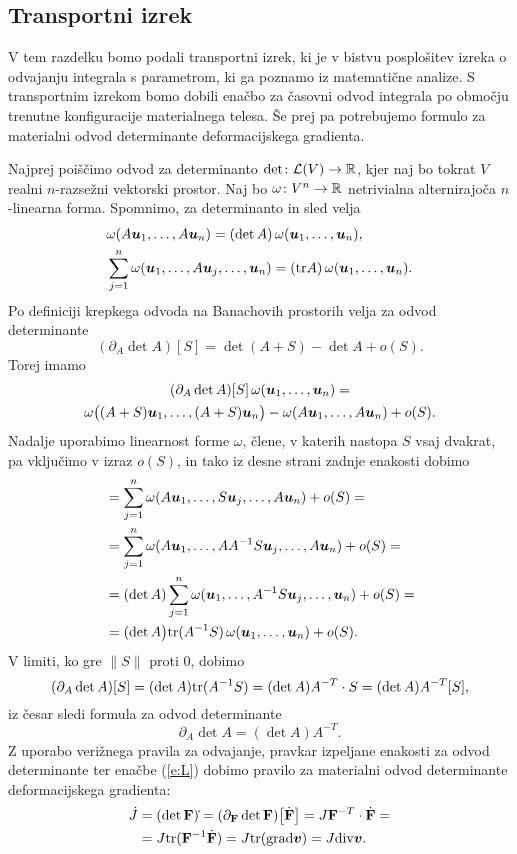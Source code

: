 \subsection{Transportni izrek}


V tem razdelku bomo podali transportni izrek, ki je v bistvu posplošitev izreka o odvajanju
integrala s parametrom, ki ga poznamo iz matematične analize. S transportnim izrekom
bomo dobili enačbo za časovni odvod integrala po območju trenutne konfiguracije materialnega telesa.
Še prej pa potrebujemo formulo za materialni odvod determinante deformacijskega gradienta.

Najprej poiščimo odvod za determinanto $\det\colon\mathcal L(V)\to\mathbb R$, kjer naj bo tokrat $V$
realni $n$-razsežni vektorski prostor. Naj bo $\omega\colon V^n\to\mathbb R$ netrivialna
alternirajoča $n$-linearna forma. Spomnimo, za determinanto in sled velja
\begin{align*}
	&\omega(A\boldsymbol u_1,\dots,A\boldsymbol u_n)=(\det A)\,\omega(\boldsymbol u_1,\dots,\boldsymbol u_n), \\
	&\sum_{j=1}^n\omega(\boldsymbol u_1,\dots,A\boldsymbol u_j,\dots,\boldsymbol u_n)=(\mathrm{tr} A)\,\omega(\boldsymbol u_1,\dots,\boldsymbol u_n).
\end{align*}
Po definiciji krepkega odvoda na Banachovih prostorih velja za odvod determinante
\[ (\partial_{A}\det A)[S] = \det(A+S) - \det A + o(S). \]
Torej imamo
\begin{multline*}
	(\partial_{A}\det A)[S]\,\omega(\boldsymbol u_1,\dots,\boldsymbol u_n)=\\
	\omega\big((A+S)\boldsymbol u_1,\dots,(A+S)\boldsymbol u_n\big) -
	\omega(A\boldsymbol u_1,\dots,A\boldsymbol u_n) + o(S).
\end{multline*}
Nadalje uporabimo linearnost forme $\omega$, člene, v katerih nastopa $S$ vsaj dvakrat,
pa vključimo v izraz $o(S)$, in tako iz desne strani zadnje enakosti dobimo
\begin{align*}
	&= \sum_{j=1}^n\omega(A\boldsymbol u_1,\dots,S\boldsymbol u_j,\dots,A\boldsymbol u_n) + o(S) = \\
	&= \sum_{j=1}^n\omega(A\boldsymbol u_1,\dots,AA^{-1}S\boldsymbol u_j,\dots,A\boldsymbol u_n) + o(S) = \\
	&= (\det A)\sum_{j=1}^n\omega(\boldsymbol u_1,\dots,A^{-1}S\boldsymbol u_j,\dots,\boldsymbol u_n) + o(S) = \\
	&= (\det A\big)\mathrm{tr}(A^{-1}S)\,\omega(\boldsymbol u_1,\dots,\boldsymbol u_n) + o(S).
\end{align*}
V limiti, ko gre $\|S\|$ proti 0, dobimo
\[
	(\partial_{A}\det A)[S] = (\det A)\mathrm{tr}(A^{-1}S) = (\det A)A^{-T}\cdot S=(\det A)A^{-T}[S],
\]
iz česar sledi formula za odvod determinante
\[ \partial_{A}\det A=(\det A)A^{-T}. \]
Z uporabo verižnega pravila za odvajanje, pravkar izpeljane enakosti za odvod determinante
ter enačbe (\ref{e:L}) dobimo pravilo za materialni odvod determinante deformacijskega gradienta:
\begin{align}
	\dot{J}&=(\det\mathbf F)\dot{}=(\partial_{\mathbf F}\det\mathbf F)\big[\dot{\mathbf F}\big]=J\mathbf F^{-T}\cdot\dot{\mathbf F}=
	\nonumber \\ &= J\mathrm{tr}(\mathbf F^{-1}\dot{\mathbf F}) = J\mathrm{tr}(\mathrm{grad}\boldsymbol v)=J\mathrm{div}\boldsymbol v. \label{e:dotJ}
\end{align}

